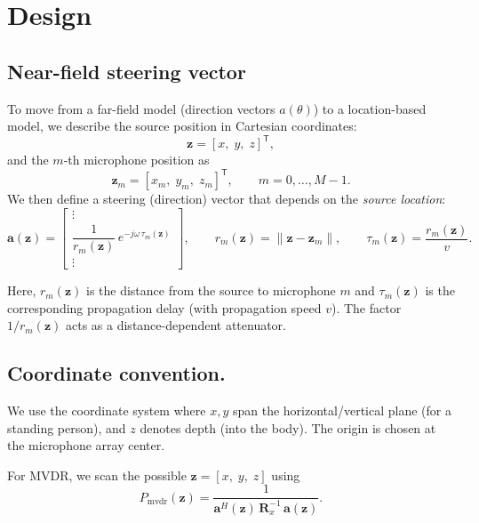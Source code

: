 \section{Design}


\subsection{Near-field steering vector}
To move from a far-field model (direction vectors $a(\theta)$) to a location-based model,
we describe the source position in Cartesian coordinates:
\[
\mathbf{z} = [x,\;y,\;z]^{\mathsf T},
\]
and the $m$-th microphone position as
\[
\mathbf{z}_m = [x_m,\;y_m,\;z_m]^{\mathsf T}, \qquad m = 0,\dots,M-1.
\]
We then define a steering (direction) vector that depends on the \emph{source location}:
\begin{equation}
\mathbf{a}(\mathbf{z})
=
\begin{bmatrix}
\vdots\\[2pt]
\dfrac{1}{r_m(\mathbf{z})}\,e^{-j\omega\,\tau_m(\mathbf{z})}\\[2pt]
\vdots
\end{bmatrix},
\qquad
r_m(\mathbf{z}) = \lVert \mathbf{z}-\mathbf{z}_m\rVert,
\qquad
\tau_m(\mathbf{z}) = \dfrac{r_m(\mathbf{z})}{v}.
\label{eq:nearfield_steering}
\end{equation}

Here, $r_m(\mathbf{z})$ is the distance from the source to microphone $m$ and
$\tau_m(\mathbf{z})$ is the corresponding propagation delay (with propagation speed $v$). The factor $1/r_m(\mathbf{z})$ acts as a distance-dependent attenuator.

\subsection{Coordinate convention.}
We use the coordinate system where $x,y$ span the horizontal/vertical plane (for a standing person),
and $z$ denotes depth (into the body). The origin is chosen at the microphone array center.



For MVDR, we scan the possible \(\mathbf{z} = [x,\;y,\;z]\)
using
\begin{equation}
P_{\mathrm{mvdr}}(\mathbf{z})
= \frac{1}{\mathbf{a}^H(\mathbf{z})\, \mathbf{R}_x^{-1}\, \mathbf{a}(\mathbf{z})}.
\label{eq:Pmvdr}
\end{equation}

